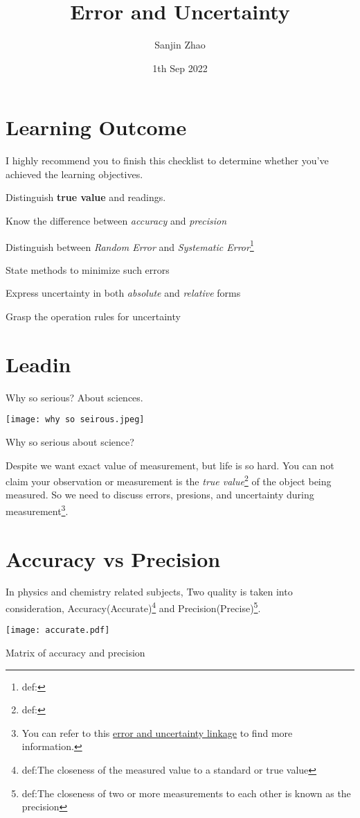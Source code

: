 \documentclass[a4paper]{tufte-handout}
\title{Error and Uncertainty}
\author{Sanjin Zhao}
\date{1th Sep 2022}  %
\begin{document}
\maketitle%

\section*{Learning Outcome}
I highly recommend you to finish this checklist to determine whether you've achieved the learning objectives.
\begin{todolist}
	\item Distinguish \textbf{true value} and readings.
	\item Know the difference between \emph{accuracy} and \emph{precision}
	\item Distinguish between \emph{Random Error} and \emph{Systematic Error}\footnote{def:}
	\item State methods to minimize such errors
	\item Express uncertainty in both \emph{absolute} and \emph{relative} forms
	\item Grasp the operation rules for uncertainty
\end{todolist}
\clearpage

\section*{Leadin}
Why so serious?   About sciences.
\begin{marginfigure}
\texttt{[image: why so seirous.jpeg]}
\caption{Why so serious about science?}
\end{marginfigure}
Despite we want exact value of measurement, but life is so hard. You can not claim your observation or measurement is the \emph{true value}\footnote{def:} of the object being measured. So we need to discuss errors, presions, and uncertainty during measurement\footnote{You can refer to this 
\href{https://www.savemyexams.co.uk/a-level/physics/cie/22/revision-notes/1-physical-quantities--units/1-2-measurements--errors/1-2-1-errors--uncertainties/}{error and uncertainty linkage} to find more information.}.

\section{Accuracy vs Precision}
In physics and chemistry related subjects, Two quality is taken into consideration, Accuracy(Accurate)\footnote{def:The closeness of the measured value to a standard or true value} and Precision(Precise)\footnote{def:The closeness of two or more measurements to each other is known as the precision}.
\begin{center}
\centering
\texttt{[image: accurate.pdf]}
\caption{Matrix of accuracy and precision}
\label{fig:acc vs pre}
\end{center}
\end{document}

